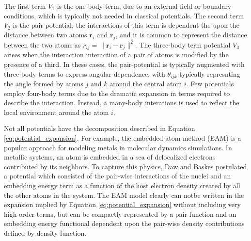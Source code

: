 The first term $V_1$ is the one body term, due to an external field or boundary conditions, which is typically not needed in classical potentials.  The second term $V_2$ is the pair potential; the interactions of this term is dependent the upon the distance between two atoms $\bm{r}_i$ and $\bm{r}_j$, and it is common to represent the distance between the two atoms as $r_{ij}=\lVert \bm{r}_i - \bm{r}_j \rVert^2$.  The three-body term potential $V_3$ arises when the interaction interaction of a pair of atoms is modified by the presence of a third.  In these cases, the pair-potential is typically augmented with three-body terms to express angular dependence, with $\theta_{ijk}$ typically represnting the angle formed by atoms $j$ and $k$ around the central atom $i$\cite{stillinger1985_sw}.  Few potentials employ four-body terms due to the dramatic expansion in terms required to describe the interaction.  Instead, a many-body interations is used to reflect the local environment around the atom $i$.

Not all potentials have the decomposition described in Equation \ref{eq:potential_expansion}.  For example, the embedded atom method (EAM)\cite{daw1984_eam} is a popular approach for modeling metals in molecular dynamics simulations.  In metallic systems, an atom is embedded in a sea of delocalized electrons contributed by its neighbors.  To capture this physics, Daw and Baskes postulated a potential which consisted of the pair-wise interactions of the nuclei and an embedding energy term as a function of the host electron density created by all the other atoms in the system.  The EAM model clearly can notbe written in the expansion implied by Equation \ref{eq:potential_expansion} without including very high-order terms, but can be compactly represented by a pair-function and an embedding energy functional dependent upon the pair-wise density contributions defined by density function.

